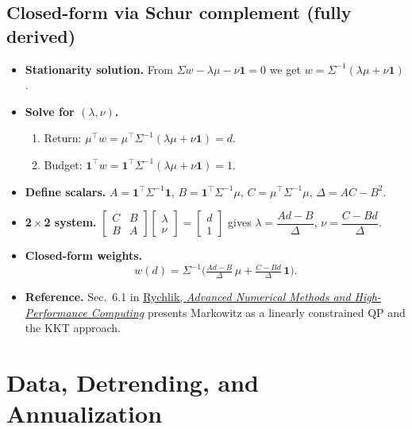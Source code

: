 \documentclass[11pt]{article}
\begin{document}
	\subsection{Closed-form via Schur complement (fully derived)}
	\begin{itemize}
		\item \textbf{Stationarity solution.} From $\Sigma w-\lambda\mu-\nu\mathbf{1}=0$ we get $w=\Sigma^{-1}(\lambda\mu+\nu\mathbf{1})$.
		\item \textbf{Solve for $(\lambda,\nu)$.}
		\begin{enumerate}
			\item Return: $\mu^\top w=\mu^\top\Sigma^{-1}(\lambda\mu+\nu\mathbf{1})=d$.
			\item Budget: $\mathbf{1}^\top w=\mathbf{1}^\top\Sigma^{-1}(\lambda\mu+\nu\mathbf{1})=1$.
		\end{enumerate}
		\item \textbf{Define scalars.} $A=\mathbf{1}^\top\Sigma^{-1}\mathbf{1}$, $B=\mathbf{1}^\top\Sigma^{-1}\mu$, $C=\mu^\top\Sigma^{-1}\mu$, $\Delta=AC-B^2$.
		\item \textbf{2\,$\times$\,2 system.} $\begin{bmatrix}C & B\\ B & A\end{bmatrix}\begin{bmatrix}\lambda\\ \nu\end{bmatrix}=\begin{bmatrix}d\\ 1\end{bmatrix}$ gives $\lambda=\dfrac{A d-B}{\Delta}$, $\nu=\dfrac{C-B d}{\Delta}$.
		\item \textbf{Closed-form weights.}
		\begin{equation}\label{eq:closed-form}
			w(d)=\Sigma^{-1}\Big(\tfrac{A d-B}{\Delta}\,\mu+\tfrac{C-B d}{\Delta}\,\mathbf{1}\Big).
		\end{equation}
		\item \textbf{Reference.} Sec.~6.1 in \href{numbook.pdf}{Rychlik, \emph{Advanced Numerical Methods and High-Performance Computing}} presents Markowitz as a linearly constrained QP and the KKT approach.
	\end{itemize}
	
	\section{Data, Detrending, and Annualization}
\end{document}

